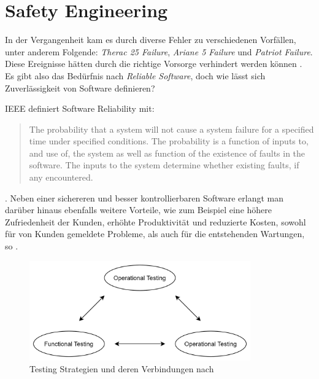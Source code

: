     \section{Safety Engineering}
        In der Vergangenheit kam es durch diverse Fehler zu verschiedenen Vorfällen, unter anderem Folgende:
        \textit{Therac 25 Failure}, \textit{Ariane 5 Failure} und \textit{Patriot Failure}. Diese Ereignisse hätten
        durch die richtige Vorsorge verhindert werden können \cite[s. 185]{Verma2015}. Es gibt also das Bedürfnis
        nach \textit{Reliable Software}, doch wie lässt sich Zuverlässigkeit von Software definieren?

        IEEE definiert Software Reliability mit:
        \begin{quote}
            The probability that a system will not cause a system failure for a specified time under specified conditions.
            The probability is a function of inputs to, and use of, the system as well as function of the existence of
            faults in the software. The inputs to the system determine whether existing faults, if any encountered.
        \end{quote}
        \cite[s. 183]{Verma2015}. Neben einer sichereren und besser kontrollierbaren Software erlangt man darüber hinaus
        ebenfalls weitere Vorteile, wie zum Beispiel eine höhere Zufriedenheit der Kunden, erhöhte Produktivität und reduzierte
        Kosten, sowohl für von Kunden gemeldete Probleme, als auch für die entstehenden Wartungen, so \citeauthor*{Verma2015}.

        \begin{figure}[h]
            \begin{center}
                \includegraphics[width=0.85\textwidth]{figures/testing.png}
                \caption[Testing Strategies]{Testing Strategien und deren Verbindungen nach \cite{bertolino2019}}
                \label{pic:testing-strategies}
            \end{center}
        \end{figure}

